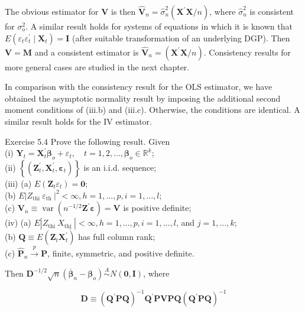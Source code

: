 \documentclass[10pt]{article}
\begin{document}
The obvious estimator for $\mathbf{V}$ is then $\hat{\mathbf{V}}_{n}=\hat{\sigma}_{n}^{2}\left(\mathbf{X}^{\prime} \mathbf{X} / n\right)$, where $\hat{\sigma}_{n}^{2}$ is consistent for $\sigma_{o}^{2}$. A similar result holds for systems of equations in which it is known that $E\left(\varepsilon_{t} \varepsilon_{t}^{\prime} \mid \mathbf{X}_{t}\right)=\mathbf{I}$ (after suitable transformation of an underlying DGP). Then $\mathbf{V}=\mathbf{M}$ and a consistent estimator is $\hat{\mathbf{V}}_{n}=\left(\mathbf{X}^{\prime} \mathbf{X} / n\right)$. Consistency results for more general cases are studied in the next chapter.

In comparison with the consistency result for the OLS estimator, we have obtained the asymptotic normality result by imposing the additional second moment conditions of (iii.b) and (iii.c). Otherwise, the conditions are identical. A similar result holds for the IV estimator.

Exercise 5.4 Prove the following result. Given\\
(i) $\mathbf{Y}_{t}=\mathbf{X}_{t}^{\prime} \boldsymbol{\beta}_{o}+\varepsilon_{t}, \quad t=1,2, \ldots, \boldsymbol{\beta}_{o} \in \mathbb{R}^{k}$;\\
(ii) $\left\{\left(\mathbf{Z}_{t}^{\prime}, \mathbf{X}_{t}^{\prime}, \boldsymbol{\varepsilon}_{t}\right)\right\}$ is an i.i.d. sequence;\\
(iii) (a) $E\left(\mathbf{Z}_{t} \varepsilon_{t}\right)=\mathbf{0}$;\\
(b) $E\left|Z_{\text {thi }} \varepsilon_{\text {th }}\right|^{2}<\infty, h=1, \ldots, p, i=1, \ldots, l$;\\
(c) $\mathbf{V}_{n} \equiv \operatorname{var}\left(n^{-1 / 2} \mathbf{Z}^{\prime} \boldsymbol{\varepsilon}\right)=\mathbf{V}$ is positive definite;\\
(iv) (a) $E\left|Z_{\text {thi }} X_{\text {thj }}\right|<\infty, h=1, \ldots, p, i=1, \ldots, l$, and $j=1, \ldots, k$;\\
(b) $\mathbf{Q} \equiv E\left(\mathbf{Z}_{t} \mathbf{X}_{t}^{\prime}\right)$ has full column rank;\\
(c) $\hat{\mathbf{P}}_{n} \xrightarrow{p} \mathbf{P}$, finite, symmetric, and positive definite.

Then $\mathbf{D}^{-1 / 2} \sqrt{n}\left(\overline{\boldsymbol{\beta}}_{n}-\boldsymbol{\beta}_{o}\right) \stackrel{A}{\sim} N(\mathbf{0}, \mathbf{I})$, where

$$
\mathbf{D} \equiv\left(\mathbf{Q}^{\prime} \mathbf{P Q}\right)^{-1} \mathbf{Q}^{\prime} \mathbf{P} \mathbf{V P Q}\left(\mathbf{Q}^{\prime} \mathbf{P Q}\right)^{-1}
$$
\end{document}
